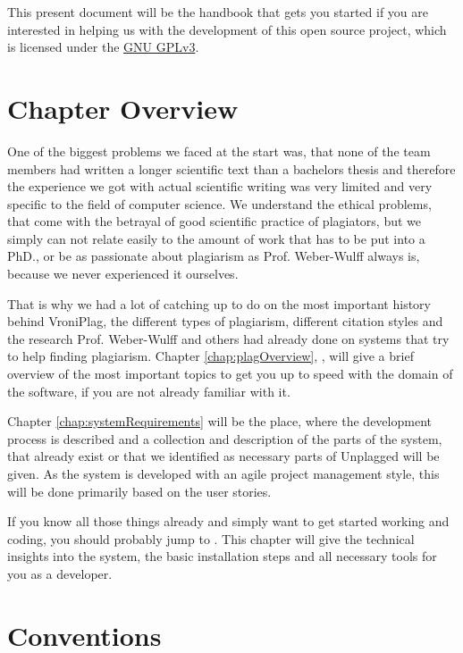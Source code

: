 This present document will be the handbook that gets you started if you are interested in helping us with the development of this 
open source project, which is licensed under the \href{http://www.gnu.org/licenses/quick-guide-gplv3}{GNU GPLv3}.

\section*{Chapter Overview}

One of the biggest problems we faced at the start was, that none of the team members had written a longer scientific
text than a bachelors
thesis and therefore the experience we got with actual scientific writing was very limited and very specific to the 
field of computer science. We understand the ethical problems, that come with the betrayal of 
good scientific practice of plagiators, but we simply can not relate easily to the amount of work that has to be put into 
a PhD., or be as 
passionate about plagiarism as Prof. Weber-Wulff always is, because we never experienced it ourselves.

That is why we had a lot of catching up to do on the most important history behind VroniPlag, the different types
of plagiarism, different citation styles and the research Prof. Weber-Wulff and others had already done on systems that try to 
help finding plagiarism. Chapter \ref{chap:plagOverview}, , will
give a brief overview of the most important topics to get you up to speed with the domain of the software, if you are
not already familiar with it.

Chapter \ref{chap:systemRequirements} will be the place, where the development process is described and a collection and description 
of the parts of the system, that already exist or that we identified as 
necessary parts of Unplagged will be given. As the system is developed with an agile project management style, this will be done
primarily based on the user stories.

If you know all those things already and simply want to get started working and coding, you should probably jump
to . This chapter will give the technical insights into the system, the basic installation
steps and all necessary tools for you as a developer.


\section*{Conventions}

